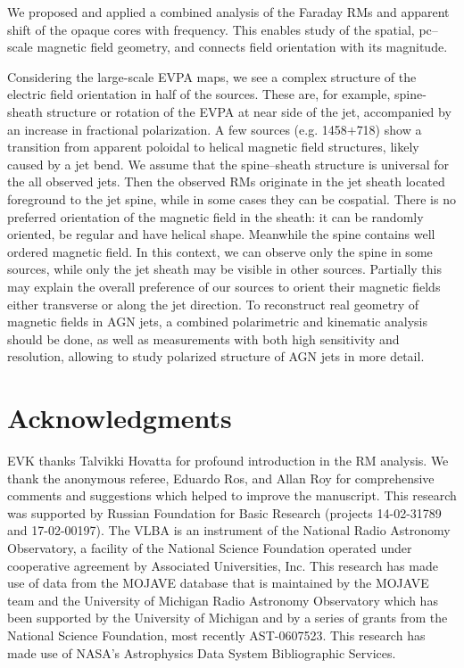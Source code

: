 \documentclass[a4paper,fleqn,usenatbib,useAMS]{mnras}
\begin{document}
We proposed and applied a combined analysis of the Faraday RMs and apparent shift of the opaque cores with frequency. This enables study of the spatial, pc--scale magnetic field geometry, and connects field orientation with its magnitude.


Considering the large-scale EVPA maps, we see a complex structure of the electric field orientation in half of the sources.
These are, for example, spine-sheath structure or rotation of the EVPA at near side of the jet, accompanied by an increase in fractional polarization.
A few sources (e.g. 1458$+$718) show a transition from apparent poloidal to helical magnetic field structures, likely caused by a jet bend.
We assume that the spine--sheath structure is universal for the all observed jets. Then the observed RMs originate in the jet sheath located foreground to the jet spine, while in some cases they can be cospatial. There is no preferred orientation of the magnetic field in the sheath: it can be randomly oriented, be regular and have helical shape. Meanwhile the spine contains well ordered magnetic field.
In this context, we can observe only the spine in some sources, while only the jet sheath may be visible in other sources.
Partially this may explain the overall preference of our sources to orient their magnetic fields either transverse or along the jet direction.
To reconstruct real geometry of magnetic fields in AGN jets, a combined polarimetric and kinematic analysis should be done, as well as measurements with both high sensitivity and resolution, allowing to study polarized structure of AGN jets in more detail.

\section*{Acknowledgments}
EVK thanks Talvikki Hovatta for profound introduction in the RM analysis.
We thank the anonymous referee, Eduardo Ros, and Allan Roy for comprehensive comments and suggestions which helped to improve the manuscript.
This research was supported by Russian Foundation for Basic Research (projects 14-02-31789 and 17-02-00197). 
The VLBA is an instrument of the National Radio Astronomy Observatory, a facility of the National
Science Foundation operated under cooperative agreement by Associated Universities, Inc. 
This research has made use of data from the MOJAVE database that is maintained by the MOJAVE 
team \citep{lister_etal09} and the University of Michigan Radio Astronomy Observatory which has been supported by the University of Michigan and by a series of grants from the National Science 
Foundation, most recently AST-0607523. This research has made use of NASA's Astrophysics Data System Bibliographic Services.
\end{document}
